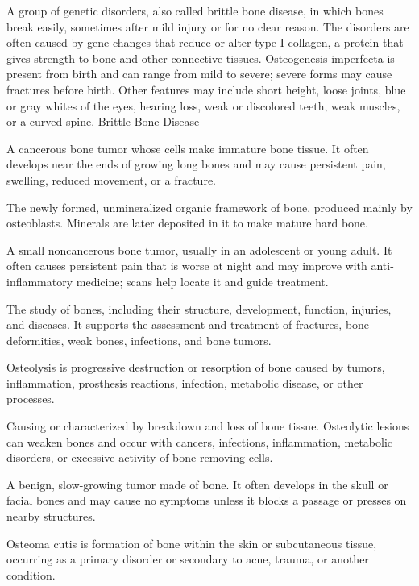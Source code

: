  A group of genetic disorders, also called brittle bone disease, in which bones break easily, sometimes after mild injury or for no clear reason. The disorders are often caused by gene changes that reduce or alter type I collagen, a protein that gives strength to bone and other connective tissues. Osteogenesis imperfecta is present from birth and can range from mild to severe; severe forms may cause fractures before birth. Other features may include short height, loose joints, blue or gray whites of the eyes, hearing loss, weak or discolored teeth, weak muscles, or a curved spine.
\synonyms
Brittle Bone Disease

 A cancerous bone tumor whose cells make immature bone tissue. It often develops near the ends of growing long bones and may cause persistent pain, swelling, reduced movement, or a fracture.

 The newly formed, unmineralized organic framework of bone, produced mainly by osteoblasts. Minerals are later deposited in it to make mature hard bone.

 A small noncancerous bone tumor, usually in an adolescent or young adult. It often causes persistent pain that is worse at night and may improve with anti-inflammatory medicine; scans help locate it and guide treatment.

 The study of bones, including their structure, development, function, injuries, and diseases. It supports the assessment and treatment of fractures, bone deformities, weak bones, infections, and bone tumors.

 Osteolysis is progressive destruction or resorption of bone caused by tumors, inflammation, prosthesis reactions, infection, metabolic disease, or other processes.

 Causing or characterized by breakdown and loss of bone tissue. Osteolytic lesions can weaken bones and occur with cancers, infections, inflammation, metabolic disorders, or excessive activity of bone-removing cells.

 A benign, slow-growing tumor made of bone. It often develops in the skull or facial bones and may cause no symptoms unless it blocks a passage or presses on nearby structures.

 Osteoma cutis is formation of bone within the skin or subcutaneous tissue, occurring as a primary disorder or secondary to acne, trauma, or another condition.


